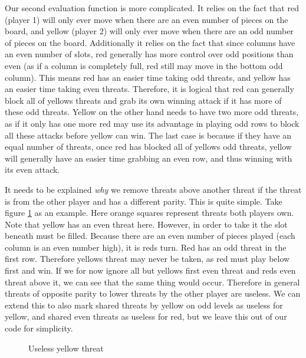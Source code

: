 \documentclass{article}
\newcommand{\rd}{\node [player, fill=red]{};}
\newcommand{\yw}{\node [player, fill=yellow] {};}
\newcommand{\gy}{\node [player, fill=white] {};}
\newcommand{\bt}{\node [threat, fill=orange!50] {};}
\begin{document}
		Our second evaluation function is more complicated. It relies on the fact that red (player 1) will only ever move when there are an even number of pieces on the board, and yellow (player 2) will only ever move when there are an odd number of pieces on the board. Additionally it relies on the fact that since columns have an even number of slots, red generally has more control over odd positions than even (as if a column is completely full, red still may move in the bottom odd column). This means red has an easier time taking odd threats, and yellow has an easier time taking even threats. Therefore, it is logical that red can generally block all of yellows threats and grab its own winning attack if it has more of these odd threats. Yellow on the other hand needs to have two more odd threats, as if it only has one more red may use its advantage in playing odd rows to block all these attacks before yellow can win. The last case is because if they have an equal number of threats, once red has blocked all of yellows odd threats, yellow will generally have an easier time grabbing an even row, and thus winning with its even attack.
		
		It needs to be explained \emph{why} we remove threats above another threat if the threat is from the other player and has a different parity. This is quite simple. Take figure \ref{threatblock} as an example. Here orange squares represent threats both players own. Note that yellow has an even threat here. However, in order to take it the slot beneath must be filled. Because there are an even number of pieces played (each column is an even number high), it is reds turn. Red has an odd threat in the first row. Therefore yellows threat may never be taken, as red must play below first and win. If we for now ignore all but yellows first even threat and reds even threat above it, we can see that the same thing would occur. Therefore in general threats of opposite parity to lower threats by the other player are useless. We can extend this to also mark shared threats by yellow on odd levels as useless for yellow, and shared even threats as useless for red, but we leave this out of our code for simplicity.
		
			\begin{figure}[t]
			\centering
			\caption{Useless yellow threat}
			\label{threatblock}
			\end{figure}
\end{document}
